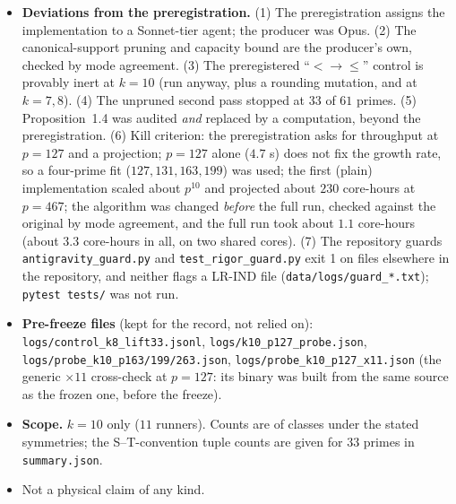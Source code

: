 \documentclass[10pt]{article}
\begin{document}
\begin{itemize}
\item \textbf{Deviations from the preregistration.} (1) The preregistration assigns the implementation to a Sonnet-tier agent; the producer was Opus. (2) The canonical-support pruning and capacity bound are the producer's own, checked by mode agreement. (3) The preregistered ``$<\to\le$'' control is provably inert at $k=10$ (run anyway, plus a rounding mutation, and at $k=7,8$). (4) The unpruned second pass stopped at $33$ of $61$ primes. (5) Proposition~1.4 was audited \emph{and} replaced by a computation, beyond the preregistration. (6) Kill criterion: the preregistration asks for throughput at $p=127$ and a projection; $p=127$ alone ($4.7$ s) does not fix the growth rate, so a four-prime fit ($127,131,163,199$) was used; the first (plain) implementation scaled about $p^{10}$ and projected about $230$ core-hours at $p=467$; the algorithm was changed \emph{before} the full run, checked against the original by mode agreement, and the full run took about $1.1$ core-hours (about $3.3$ core-hours in all, on two shared cores). (7) The repository guards \texttt{antigravity\_guard.py} and \texttt{test\_rigor\_guard.py} exit 1 on files elsewhere in the repository, and neither flags a LR-IND file (\texttt{data/logs/guard\_*.txt}); \texttt{pytest tests/} was not run.
\item \textbf{Pre-freeze files} (kept for the record, not relied on): \texttt{logs/control\_k8\_lift33.jsonl}, \texttt{logs/k10\_p127\_probe.json}, \texttt{logs/probe\_k10\_p163/199/263.json}, \texttt{logs/probe\_k10\_p127\_x11.json} (the generic $\times11$ cross-check at $p=127$: its binary was built from the same source as the frozen one, before the freeze).
\item \textbf{Scope.} $k=10$ only ($11$ runners). Counts are of classes under the stated symmetries; the S--T-convention tuple counts are given for $33$ primes in \texttt{summary.json}.
\item Not a physical claim of any kind.
\end{itemize}

\end{document}
